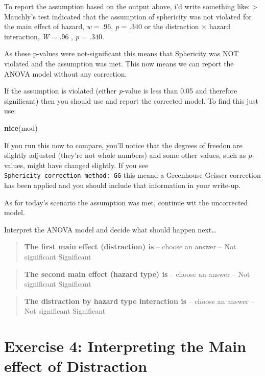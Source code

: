 \documentclass[
]{book}
\newenvironment{Shaded}{\begin{snugshade}}{\end{snugshade}}
\newcommand{\FunctionTok}[1]{\textcolor[rgb]{0.13,0.29,0.53}{\textbf{#1}}}
\newcommand{\NormalTok}[1]{#1}
\let\oldsection\section
\renewcommand{\section}{\needspace{5\baselineskip}\oldsection}
\begin{document}
To report the assumption based on the output above, i'd write something like:
\textgreater{} Mauchly's test indicated that the assumption of sphericity was not violated for the main effect of hazard, \emph{w} = .96, \emph{p} = .340 or the distraction × hazard interaction, \emph{W} = .96 , \emph{p} = .340.

As these p-values were not-significant this means that Sphericity was NOT violated and the assumption was met. This now means we can report the ANOVA model without any correction.

If the assumption is violated (either \emph{p}-value is less than 0.05 and therefore significant) then you should use and report the corrected model. To find this just use:

\begin{Shaded}
\begin{Highlighting}[]
\FunctionTok{nice}\NormalTok{(mod)}
\end{Highlighting}
\end{Shaded}

If you run this now to compare, you'll notice that the degrees of freedon are slightly adjusted (they're not whole numbers) and some other values, such as \emph{p}-values, might have changed slightly. If you see \texttt{Sphericity\ correction\ method:\ GG} this meand a Greenhouse-Geisser correction has been applied and you should include that information in your write-up.

As for today's scenario the assumption was met, continue wit the uncorrected model.

Interpret the ANOVA model and decide what should happen next\ldots{}

\begin{quote}
\textbf{The first main effect (distraction) is} -- choose an answer -- Not significant Significant
\end{quote}

\begin{quote}
\textbf{The second main effect (hazard type) is} -- choose an answer -- Not significant Significant
\end{quote}

\begin{quote}
\textbf{The distraction by hazard type interaction is} -- choose an answer -- Not significant Significant
\end{quote}

\section{Exercise 4: Interpreting the Main effect of Distraction}\label{exercise-4-interpreting-the-main-effect-of-distraction}
\end{document}
